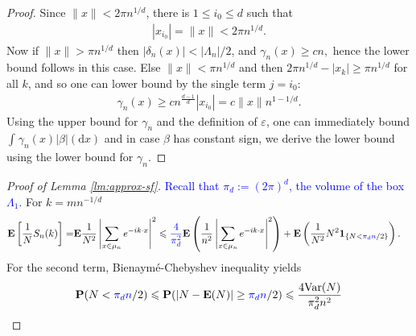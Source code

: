 \documentclass[12pt]{article}
\newcommand{\1}{\mathbf{1}}
\newcommand{\md}{\mathrm{d}}
\newcommand{\dy}[1]{\textcolor{blue}{#1}}
\newcommand{\dy}[1]{#1}%
\begin{document}
{{{{{\begin{proof}
{Since $ \|x\| < 2\pi n^{ 1/d}$, there is} $1 \leqslant i_{0} \leqslant d$ such that
%
\begin{align*}
|x_{i_{0}}|  = \|x\| <2\pi n^{ 1/d}.
\end{align*}
%
Now if $ \|x\|>\pi n^{ 1/d}$ then $| \delta _{n}(x)| < | \Lambda _{n} | /2$, and $ \gamma _{n}(x)\geqslant cn,$ hence the lower bound follows in this case.
Else $ \|x\|< \pi n^{ 1/d}$ and then $ 2\pi n^{ 1/d}- | x_{k} | \geqslant  \pi n^{ 1/d}$ for all $k$, and so one can lower bound by the single term $ j = i_{0}:$
%
\begin{align*}\gamma _{n}(x)\geqslant cn^{\frac{ d- 1}{d}}|x_{i_{0}}| = c\|x\|n^{ 1- 1/d}.
\end{align*}
%
{Using the upper bound for $\gamma_n$ and the definition of $\varepsilon$, one can immediately bound $\int_{}\gamma _{n}(x)|\beta|(\md x)$ and in case $\beta$ has constant sign, we derive the lower bound using the lower bound for $\gamma_n$.}
\end{proof}


\begin{proof}[Proof of Lemma  \ref{lm:approx-sf}]
%
\dy{Recall that $\pi_d := (2\pi)^d$, the volume of the box $\Lambda_1$.} For $ k= mn^{-1/d}$
\begin{align}
\label{eq:approx-SI}
\mathbf{E}\left[
 \frac{ 1}{N}S_{ {n}}(k)
\right]=&\mathbf{E} \frac{ 1}{N^{2}}\left|
\sum_{x\in \mu  _{n}}e^{-ik\cdot x}
\right|^{2}
\leqslant \dy{\frac{4}{\pi_d^2}}\mathbf{E}\left(
\frac{ 1}{n^{2}}\left|
\sum_{x {\in \mu_n}}e^{-ik\cdot x}
\right|^{2}
\right)+\mathbf{E}\left(
\frac{ 1}{N^{2}}N^{2}\mathbf{1}_{\{N< \dy{\pi_d n}/2\}}
\right).
\end{align}
%
For the second term, Bienaym\'e-Chebyshev inequality yields
\begin{align*}
\mathbf{P}(N < \dy{\pi_d n}/2)\leqslant \mathbf{P}(| N-\mathbf{E}(N) | \geq  \dy{\pi_d n}/2)\leqslant \frac{4\text{\rm Var}(N)}{\pi_d^2n^{2}}
\end{align*}



\end{proof}}}}}}
\end{document}
